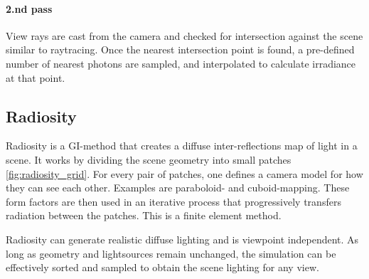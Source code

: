 		\paragraph{2.nd pass} View rays are cast from the camera and checked for intersection against the scene similar to raytracing. Once the nearest intersection point is found, a pre-defined number of nearest photons are sampled, and interpolated to calculate irradiance at that point.
			
	\subsection {Radiosity}
		Radiosity is a GI-method that creates a diffuse inter-reflections map of light in a scene. It works by dividing the scene geometry into small
		patches \ref{fig:radiosity_grid}. For every pair of patches, one defines a camera model for how they can
		see each other. Examples are paraboloid- and cuboid-mapping. These form factors are then used
		in an iterative process that progressively transfers radiation between the
		patches. This is a finite element method.

		Radiosity can generate realistic diffuse lighting and is viewpoint independent. As long as
		geometry and lightsources remain unchanged, the simulation can be effectively
		sorted and sampled to obtain the scene lighting for any view.


